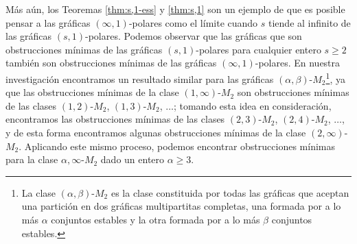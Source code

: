 M\'as a\'un, los Teoremas \ref{thm:s,1-ess} y \ref{thm:s,1}
son un ejemplo de que es posible pensar a las gr\'aficas 
$(\infty,1)$-polares como el l\'imite cuando $s$ tiende al 
infinito de las gr\'aficas $(s,1)$-polares. Podemos observar que
las gráficas que son obstrucciones mínimas de las gráficas 
$(s,1)$-polares para cualquier entero $s \ge 2$ también son 
obstrucciones mínimas de las gráficas $(\infty,1)$-polares. En 
nuestra investigación encontramos un resultado similar para las 
gráficas $(\alpha,\beta)$-$M_2$\footnote{La clase 
$(\alpha,\beta)$-$M_2$ es la clase constituida por todas las 
gráficas que aceptan una partición en dos gráficas multipartitas
completas, una formada por a lo más $\alpha$ conjuntos estables 
y la otra formada por a lo más $\beta$ conjuntos estables.}, ya 
que las obstrucciones mínimas de la clase $(1,\infty)$-$M_2$ son
obstrucciones mínimas de las clases $(1,2)$-$M_2$, 
$(1,3)$-$M_2$, $\dots$; tomando esta idea en consideración, 
encontramos las obstrucciones mínimas de las clases 
$(2,3)$-$M_2$, $(2,4)$-$M_2$, $\dots$, y de esta forma 
encontramos algunas obstrucciones mínimas de la clase 
$(2,\infty)$-$M_2$. Aplicando este mismo proceso, podemos 
encontrar obstrucciones mínimas para la clase 
$\alpha,\infty$-$M_2$ dado un entero $\alpha \geq 3$.
